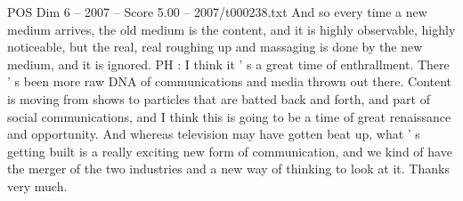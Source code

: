 \begin{textsample}{POS Dim 6 – 2007 – Score 5.00 – 2007/t000238.txt}
And so every time a new medium arrives, the old medium is the content, and it is highly observable, highly noticeable, but the real, real roughing up and massaging is done by the new medium, and it is ignored.
PH : I think it ' s a great time of enthrallment.
There ' s been more raw DNA of communications and media thrown out there.
Content is moving from shows to particles that are batted back and forth, and part of social communications, and I think this is going to be a time of great renaissance and opportunity.
And whereas television may have gotten beat up, what ' s getting built is a really exciting new form of communication, and we kind of have the merger of the two industries and a new way of thinking to look at it.
Thanks very much.

\end{textsample}

